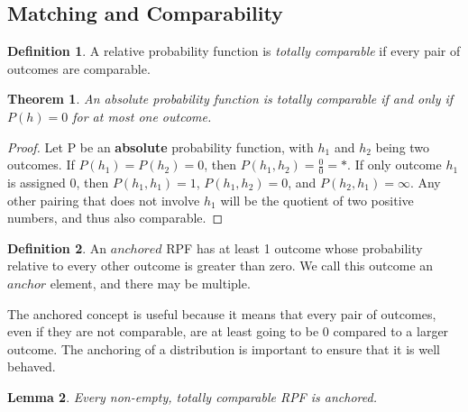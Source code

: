 \documentclass[twoside]{article}
\theoremstyle{plain}%
\newtheorem{theorem}{Theorem}[section]
\newtheorem{lemma}[theorem]{Lemma}
\theoremstyle{definition}
\newtheorem{definition}{Definition}[section]
\theoremstyle{remark}
\begin{document}
\subsection{Matching and Comparability}

\begin{definition}
A relative probability function is \textit{totally comparable} if every pair of outcomes are comparable.
\end{definition}

\begin{theorem}
An absolute probability function is totally comparable if and only if \(P(h) = 0\) for at most one outcome.
\end{theorem}

\begin{proof}
Let P be an \textbf{absolute} probability function, with \(h_1\) and \(h_2\) being two outcomes. If \(P(h_1) = P(h_2) = 0\), then \(P(h_1, h_2) = \frac{0}{0} = \ast\). If only outcome \(h_1\) is assigned 0, then \(P(h_1, h_1) = 1\), \(P(h_1, h_2) = 0\), and \(P(h_2, h_1) = \infty\). Any other pairing that does not involve \(h_1\) will be the quotient of two positive numbers, and thus also comparable.
\end{proof}

\begin{definition}
An \(anchored\) RPF has at least 1 outcome whose probability relative to every other outcome is greater than zero. We call this outcome an \(anchor\) element, and there may be multiple.
\end{definition}

The anchored concept is useful because it means that every pair of outcomes, even if they are not comparable, are at least going to be 0 compared to a larger outcome. The anchoring of a distribution is important to ensure that it is well behaved.

\begin{lemma}
\label{lemma:totally_comp_anchored}
Every non-empty, totally comparable RPF is anchored.
\end{lemma}
\end{document}
